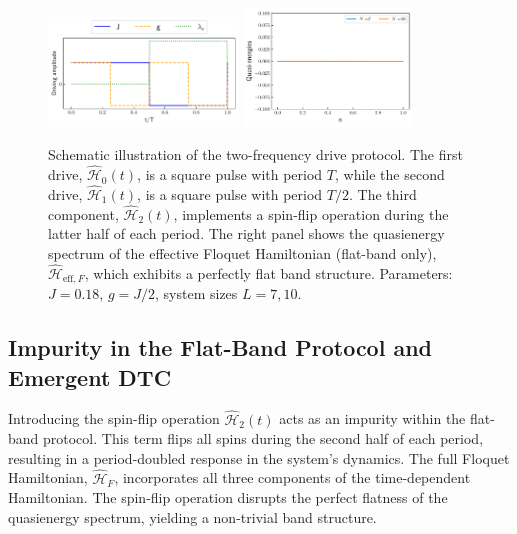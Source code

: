 \documentclass[a4paper, 10pt]{article}
\begin{document}
\begin{figure}[h!]
    \centering
    \includegraphics[width=0.45\textwidth]{figs/drive.pdf}
    \includegraphics[width=0.4\textwidth]{figs/pure_flatband.pdf}
    \caption{Schematic illustration of the two-frequency drive protocol. The first drive, $\hat{\mathcal{H}}_0(t)$, is a square pulse with period $T$, while the second drive, $\hat{\mathcal{H}}_1(t)$, is a square pulse with period $T/2$. The third component, $\hat{\mathcal{H}}_2(t)$, implements a spin-flip operation during the latter half of each period. The right panel shows the quasienergy spectrum of the effective Floquet Hamiltonian (flat-band only), $\hat{\mathcal{H}}_{\text{eff},F}$, which exhibits a perfectly flat band structure. Parameters: $J=0.18$, $g=J/2$, system sizes $L=7, 10$.}
    \label{fig:drive}
\end{figure}

\subsection{Impurity in the Flat-Band Protocol and Emergent DTC}
Introducing the spin-flip operation $\hat{\mathcal{H}}_2(t)$ acts as an impurity within the flat-band protocol. This term flips all spins during the second half of each period, resulting in a period-doubled response in the system's dynamics. The full Floquet Hamiltonian, $\hat{\mathcal{H}}_F$, incorporates all three components of the time-dependent Hamiltonian. The spin-flip operation disrupts the perfect flatness of the quasienergy spectrum, yielding a non-trivial band structure.
\end{document}
